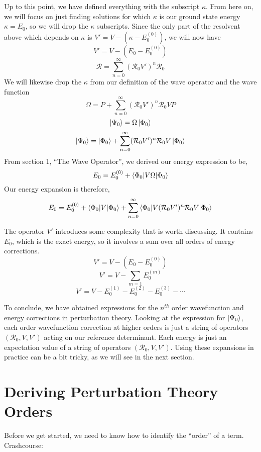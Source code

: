 \documentclass{article}
\newcommand{\Ezero}{E^{(0)}}
\newcommand{\Rz}{\mathcal{R}_{0}}
\begin{document}
Up to this point, we have defined everything with the subscript $\kappa$.
From here on, we will focus on just finding solutions for which $\kappa$ is our ground 
state energy $\kappa = E_0$, so we will drop the $\kappa$ subscripts.
Since the only part of the resolvent above which depends on $\kappa$ is 
$V' = V - (\kappa - \Ezero_0)$, we will now have 
\[V' = V - (E_0 - \Ezero_0)\]
\[\mathcal{R} = \sum_{n=0}^{\infty} (\Rz V')^n \Rz \]
We will likewise drop the $\kappa$ from our definition of the wave operator 
and the wave function
\[\Omega = P + \sum_{n=0}^{\infty} (\Rz V')^n \Rz V P \]
\[\ket{\Psi_0} = \Omega \ket{\Phi_0}\]
\[\ket{\Psi_0} =  \ket{\Phi_0} + \sum_{n=0}^{\infty} (\Rz V')^n \Rz V \ket{\Phi_0} \]
From section 1, ``The Wave Operator'', we derived our energy expression to be, 
\[ E_0 = \Ezero_0 + \braket{\Phi_0 | V \Omega | \Phi_0}  \]
Our energy expansion is therefore,
\[E_0 = \Ezero_0 + \braket{\Phi_0|V|\Phi_0} + \sum_{n=0}^{\infty} \braket{\Phi_0|V (\Rz V')^n \Rz V | \Phi_0}\]

The operator $V'$ introduces some complexity that is worth discussing. 
It contains $E_0$, which is the exact energy, 
    so it involves a sum over all orders of energy corrections.
\[V' = V - (E_0 - \Ezero_0) \]
\[V' = V - \sum_{m=1} E_0^{(m)} \]
\[V' = V - E_0^{(1)} - E_0^{(2)} - E_0^{(3)} - \cdots \]

To conclude, we have obtained expressions for the $n^{th}$ order wavefunction 
and energy corrections in perturbation theory.
Looking at the expression for $\ket{\Psi_0}$, each order wavefunction correction
at higher orders is just a string of operators $(\Rz, V, V')$ acting on our reference determinant.
Each energy is just an expectation value of a string of operators $(\Rz, V, V')$.
Using these expansions in practice can be a bit tricky, as we will see in the next section.

\section{Deriving Perturbation Theory Orders}
Before we get started, we need to know how to identify the ``order'' of a term.
Crashcourse:
\end{document}
